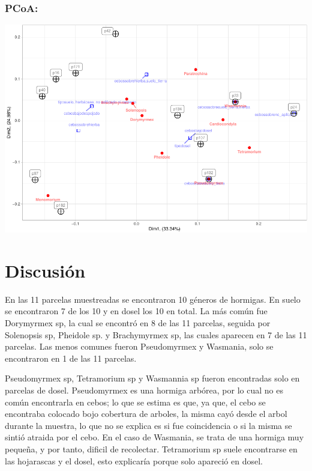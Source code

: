 \documentclass[11pt,]{article}
\newenvironment{Shaded}{\begin{snugshade}}{\end{snugshade}}
\newcommand{\KeywordTok}[1]{\textcolor[rgb]{0.13,0.29,0.53}{\textbf{#1}}}
\newcommand{\DataTypeTok}[1]{\textcolor[rgb]{0.13,0.29,0.53}{#1}}
\newcommand{\DecValTok}[1]{\textcolor[rgb]{0.00,0.00,0.81}{#1}}
\newcommand{\FloatTok}[1]{\textcolor[rgb]{0.00,0.00,0.81}{#1}}
\newcommand{\StringTok}[1]{\textcolor[rgb]{0.31,0.60,0.02}{#1}}
\newcommand{\NormalTok}[1]{#1}
\begin{document}
\subsubsection{PCoA:}\label{pcoa}

\begin{Shaded}
\end{Shaded}

\includegraphics[width=1500px]{manuscrito_files/figure-latex/pcoa_emdilone-1}

\section{Discusión}\label{discusiuxf3n}

En las 11 parcelas muestreadas se encontraron 10 géneros de hormigas. En
suelo se encontraron 7 de los 10 y en dosel los 10 en total. La más
común fue Dorymyrmex sp, la cual se encontró en 8 de las 11 parcelas,
seguida por Solenopsis sp, Pheidole sp. y Brachymyrmex sp, las cuales
aparecen en 7 de las 11 parcelas. Las menos comunes fueron Pseudomyrmex
y Wasmania, solo se encontraron en 1 de las 11 parcelas.

Pseudomyrmex sp, Tetramorium sp y Wasmannia sp fueron encontradas solo
en parcelas de dosel. Pseudomyrmex es una hormiga arbórea, por lo cual
no es común encontrarla en cebos; lo que se estima es que, ya que, el
cebo se encontraba colocado bojo cobertura de arboles, la misma cayó
desde el arbol durante la muestra, lo que no se explica es si fue
coincidencia o si la misma se sintió atraida por el cebo. En el caso de
Wasmania, se trata de una hormiga muy pequeña, y por tanto, dificil de
recolectar. Tetramorium sp suele encontrarse en las hojarascas y el
dosel, esto explicaría porque solo apareció en dosel.
\end{document}
